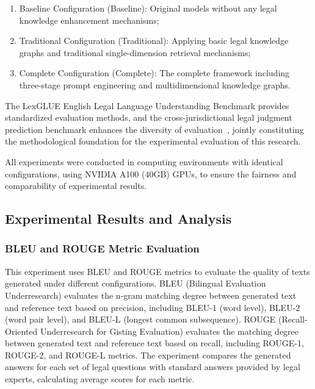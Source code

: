 \documentclass{article}
\theoremstyle{plain}
\theoremstyle{definition}
\begin{document}
\begin{enumerate}
\item Baseline Configuration (Baseline): Original models without any legal knowledge enhancement mechanisms;
\item Traditional Configuration (Traditional): Applying basic legal knowledge graphs and traditional single-dimension retrieval mechanisms;
\item Complete Configuration (Complete): The complete framework including three-stage prompt engineering and multidimensional knowledge graphs.
\end{enumerate}

The LexGLUE English Legal Language Understanding Benchmark provides standardized evaluation methods, and the cross-jurisdictional legal judgment prediction benchmark enhances the diversity of evaluation~\cite{Niklaus2021}, jointly constituting the methodological foundation for the experimental evaluation of this research.

All experiments were conducted in computing environments with identical configurations, using NVIDIA A100 (40GB) GPUs, to ensure the fairness and comparability of experimental results.

\subsection{Experimental Results and Analysis}
\label{sec4.2}

\subsubsection{BLEU and ROUGE Metric Evaluation}
\label{sec4.2.1}

This experiment uses BLEU and ROUGE metrics to evaluate the quality of texts generated under different configurations. BLEU (Bilingual Evaluation Underresearch) evaluates the n-gram matching degree between generated text and reference text based on precision, including BLEU-1 (word level), BLEU-2 (word pair level), and BLEU-L (longest common subsequence). ROUGE (Recall-Oriented Underresearch for Gisting Evaluation) evaluates the matching degree between generated text and reference text based on recall, including ROUGE-1, ROUGE-2, and ROUGE-L metrics. The experiment compares the generated answers for each set of legal questions with standard answers provided by legal experts, calculating average scores for each metric.
\end{document}
